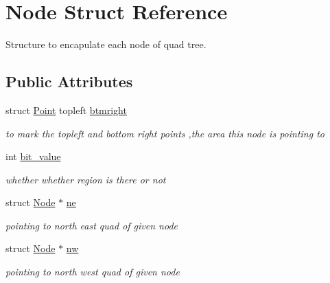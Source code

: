 \hypertarget{structNode}{}\section{Node Struct Reference}
\label{structNode}


Structure to encapulate each node of quad tree.  


\subsection*{Public Attributes}
\begin{DoxyCompactItemize}
\item 
\mbox{\label{structNode_aaa9062a8f1e7cdb47c6eccefdfdedf5f}} 
struct \hyperlink{structPoint}{Point} topleft \hyperlink{structNode_aaa9062a8f1e7cdb47c6eccefdfdedf5f}{btmright}
\begin{DoxyCompactList}\small\item\em to mark the topleft and bottom right points ,the area this node is pointing to \end{DoxyCompactList}\item 
\mbox{\label{structNode_a921de3da587516349b0527862e8b63f4}} 
int \hyperlink{structNode_a921de3da587516349b0527862e8b63f4}{bit\+\_\+value}
\begin{DoxyCompactList}\small\item\em whether whether region is there or not \end{DoxyCompactList}\item 
\mbox{\label{structNode_a4bd62abe5f16228d8e65d5c983a3937e}} 
struct \hyperlink{structNode}{Node} $\ast$ \hyperlink{structNode_a4bd62abe5f16228d8e65d5c983a3937e}{ne}
\begin{DoxyCompactList}\small\item\em pointing to north east quad of given node \end{DoxyCompactList}\item 
\mbox{\label{structNode_a4302d2ff3090125c57199d4cec56069b}} 
struct \hyperlink{structNode}{Node} $\ast$ \hyperlink{structNode_a4302d2ff3090125c57199d4cec56069b}{nw}
\begin{DoxyCompactList}\small\item\em pointing to north west quad of given node \end{DoxyCompactList}\item 

\end{DoxyCompactItemize}
